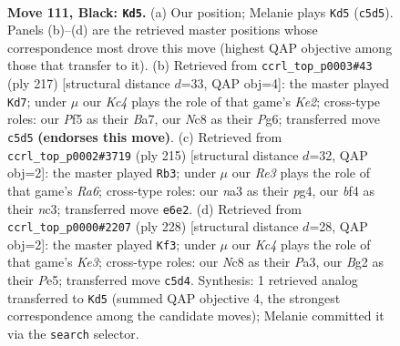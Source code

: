 \documentclass[11pt]{article}
\begin{document}
\clearpage

\begin{figure}[p]\centering
\begin{subfigure}{0.46\textwidth}\centering
\resizebox{\linewidth}{!}{%
\newchessgame
\chessboard[
  setfen={2n4K/8/p3r3/P1k2p1p/5B2/N5P1/6b1/R7 b - - 33 111},
  showmover=false,
  pgfstyle=straightmove, color=movearrow, markmove={c5-d5}
]}
\caption{}
\end{subfigure}\hfill
\begin{subfigure}{0.46\textwidth}\centering
\resizebox{\linewidth}{!}{%
\newchessgame
\chessboard[
  setfen={8/bB2k3/P5p1/1bp4p/7P/2B1K1P1/8/8 b - - 8 109},
  showmover=false,
  pgfstyle=straightmove, color=movearrow, markmove={e7-d7}
]}
\caption{}
\end{subfigure}
\\[4pt]
\begin{subfigure}{0.46\textwidth}\centering
\resizebox{\linewidth}{!}{%
\newchessgame
\chessboard[
  setfen={8/6k1/5p2/4pP2/2p3P1/r1N5/3B4/5K2 b - - 71 108},
  showmover=false,
  pgfstyle=straightmove, color=movearrow, markmove={a3-b3}
]}
\caption{}
\end{subfigure}\hfill
\begin{subfigure}{0.46\textwidth}\centering
\resizebox{\linewidth}{!}{%
\newchessgame
\chessboard[
  setfen={4bB2/7p/4p3/4PpP1/p7/P1k1K1P1/8/8 w - - 5 115},
  showmover=false,
  pgfstyle=straightmove, color=movearrow, markmove={e3-f3}
]}
\caption{}
\end{subfigure}
\caption{\textbf{Move 111, Black: \texttt{Kd5}.} (a) Our position; Melanie plays \texttt{Kd5} (\texttt{c5d5}). Panels (b)--(d) are the retrieved master positions whose correspondence most drove this move (highest QAP objective among those that transfer to it). (b) Retrieved from \texttt{ccrl\_top\_p0003\#43} (ply 217) [structural distance $d$=33, QAP obj=4]: the master played \texttt{Kd7}; under $\mu$ our \emph{Kc4} plays the role of that game's \emph{Ke2}; cross-type roles: our \emph{P}f5 as their \emph{B}a7, our \emph{N}c8 as their \emph{P}g6; transferred move \texttt{c5d5} \textbf{(endorses this move)}. (c) Retrieved from \texttt{ccrl\_top\_p0002\#3719} (ply 215) [structural distance $d$=32, QAP obj=2]: the master played \texttt{Rb3}; under $\mu$ our \emph{Re3} plays the role of that game's \emph{Ra6}; cross-type roles: our \emph{n}a3 as their \emph{p}g4, our \emph{b}f4 as their \emph{n}c3; transferred move \texttt{e6e2}. (d) Retrieved from \texttt{ccrl\_top\_p0000\#2207} (ply 228) [structural distance $d$=28, QAP obj=2]: the master played \texttt{Kf3}; under $\mu$ our \emph{Kc4} plays the role of that game's \emph{Ke3}; cross-type roles: our \emph{N}c8 as their \emph{P}a3, our \emph{B}g2 as their \emph{P}e5; transferred move \texttt{c5d4}. Synthesis: 1 retrieved analog transferred to \texttt{Kd5} (summed QAP objective 4, the strongest correspondence among the candidate moves); Melanie committed it via the \texttt{search} selector.}
\label{fig:thought-m221}
\end{figure}
\end{document}
